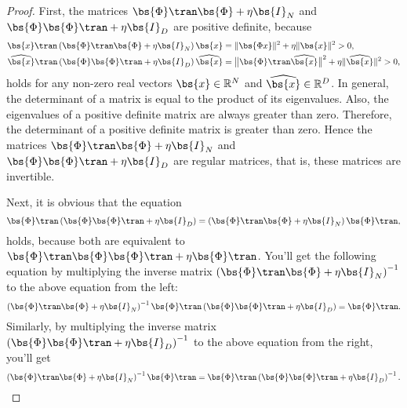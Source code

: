 \documentclass[twocolumn,a4paper,10pt]{article}
\begin{document}
\begin{proof}
First, the matrices $\bs{\Phi}\tran \bs{\Phi} + \eta \bs{I}_N$ and $\bs{\Phi} \bs{\Phi}\tran + \eta \bs{I}_D$
are positive definite, because
\begin{align*}
    \bs{x}\tran \left( \bs{\Phi}\tran \bs{\Phi} + \eta \bs{I}_N \right) \bs{x} 
    &= \| \bs{\Phi x} \|^2 + \eta \| \bs{x} \|^2 > 0, \\
    \widehat{\bs{x}}\tran \left( \bs{\Phi} \bs{\Phi}\tran + \eta \bs{I}_D \right) \widehat{\bs{x}}
    &= \bigl\| \bs{\Phi}\tran \widehat{\bs{x}} \bigr\|^2 + \eta \| \widehat{\bs{x}} \|^2 > 0,
\end{align*}
holds for any non-zero real vectors $\bs{x} \in \mathbb{R}^N$ and $\widehat{\bs{x}} \in \mathbb{R}^D$.
In general, the determinant of a matrix is equal to the product of its eigenvalues.
Also, the eigenvalues of a positive definite matrix are always greater than zero.
Therefore, the determinant of a positive definite matrix is greater than zero.
Hence the matrices $\bs{\Phi}\tran \bs{\Phi} + \eta \bs{I}_N$ and $\bs{\Phi} \bs{\Phi}\tran + \eta \bs{I}_D$
are regular matrices, that is, these matrices are invertible.

Next, it is obvious that the equation
\begin{equation*}
    \bs{\Phi}\tran \left( \bs{\Phi} \bs{\Phi}\tran + \eta \bs{I}_D \right)
    = \left( \bs{\Phi}\tran \bs{\Phi} + \eta \bs{I}_N \right) \bs{\Phi}\tran,
\end{equation*}
holds, because both are equivalent to $\bs{\Phi}\tran \bs{\Phi} \bs{\Phi}\tran + \eta \bs{\Phi}\tran$.
You'll get the following equation by multiplying the inverse matrix
$\left( \bs{\Phi}\tran \bs{\Phi} + \eta \bs{I}_N \right)^{-1}$ to the above equation from the left:
\begin{equation*}
    \left( \bs{\Phi}\tran \bs{\Phi} + \eta \bs{I}_N \right)^{-1}
    \bs{\Phi}\tran \left( \bs{\Phi} \bs{\Phi}\tran + \eta \bs{I}_D \right)
    = \bs{\Phi}\tran.
\end{equation*}
Similarly, by multiplying the inverse matrix $\left( \bs{\Phi} \bs{\Phi}\tran + \eta \bs{I}_D \right)^{-1}$
to the above equation from the right, you'll get
\begin{equation*}
    \left( \bs{\Phi}\tran \bs{\Phi} + \eta \bs{I}_N \right)^{-1} \bs{\Phi}\tran
    = \bs{\Phi}\tran \left( \bs{\Phi} \bs{\Phi}\tran + \eta \bs{I}_D \right)^{-1}.
\end{equation*}
\end{proof}
\end{document}

